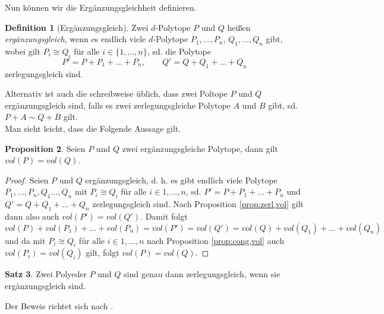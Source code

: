 \documentclass[11pt,titlepage]{article}
\theoremstyle{definition}
\newtheorem{theorem}{Satz}[section]
\newtheorem{proposition}[theorem]{Proposition}
\newtheorem{definition}[theorem]{Definition}
\theoremstyle{remark}
\begin{document}
	Nun können wir die Ergänzungsgleichheit definieren.
	
	\begin{definition}[Ergänzungsgleich]
		Zwei $d$-Polytope $P$ und $Q$ heißen \textsl{ergänzungsgleich}, wenn es endlich viele $d$-Polytope 
		$P_1,\ldots,P_n$, $Q_1,\ldots,Q_n$ gibt, wobei gilt $P_i\cong Q_i$ für alle $i\in\{1,\ldots,n\}$, sd. die Polytope
		\[P'=P+P_1+\ldots+P_n,\qquad Q'=Q+Q_1+\ldots+Q_n\]
		zerlegungsgleich sind.
	\end{definition}
	
	Alternativ ist auch die schreibweise üblich, dass zwei Poltope $P$ und $Q$
	ergänzungsgleich sind, falls es zwei zerlegungsgleiche Polytope 
	$A$ und $B$ gibt, sd. $P+A\sim Q+B$ gilt. \\
	Man sieht leicht, dass die Folgende Aussage gilt.
	
	\begin{proposition}\label{coroll:ergvol}
		Seien $P$ und $Q$ zwei ergänzungsgleiche Polytope, dann gilt $vol(P)=vol(Q)$.
	\end{proposition}
	
	\begin{proof}
		Seien $P$ und $Q$ ergänzungsgleich, d. h. es gibt endlich viele Polytope $P_1,\ldots,P_n,
		Q_1\ldots,Q_n$ mit $P_i\cong Q_i$ für alle $i\in{1,\ldots,n}$, sd. 
		$P'=P+P_1+\ldots+P_n$ und $Q'=Q+Q_1+\ldots+Q_n$ zerlegungsgleich sind. Nach 
		Proposition \ref{prop:zerl,vol} gilt dann also auch $vol(P')=vol(Q')$. Damit folgt
		\[vol(P)+vol(P_1)+\ldots+vol(P_n)=vol(P')=vol(Q')=vol(Q)+vol(Q_1)+\ldots+vol(Q_n)\]
		und da mit $P_i\cong Q_i$ für alle $i\in{1,\ldots,n}$ nach Proposition \ref{prop:cong,vol} 
		auch $vol(P_i)=vol(Q_i)$ gilt, folgt $vol(P)=vol(Q)$.
	\end{proof}
	
	\begin{theorem} \label{thm:zerlerg}
		Zwei Polyeder $P$ und $Q$ sind genau dann zerlegungsgleich, wenn sie 
		ergänzungsgleich sind.
	\end{theorem}
	
	Der Beweis richtet sich nach \cite[Satz III]{Hadwiger}.
	
\end{document}
